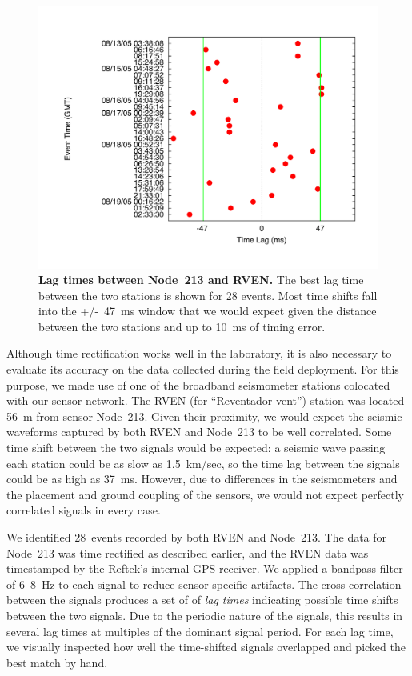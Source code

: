\begin{figure}[t]
\begin{center}
\includegraphics[width=\hsize]{./3-evaluation/figs/timingscatterplot.pdf}
\end{center}

\caption{\textbf{Lag times between Node~213 and RVEN.} The best lag time
between the two stations is shown for 28 events. Most time shifts fall into
the +/-~47~ms window that we would expect given the distance between the two
stations and up to 10~ms of timing error.}

\label{evaluation-fig-timingscatterplot}
\end{figure}


Although time rectification works well in the laboratory, it is also
necessary to evaluate its accuracy on the data collected during the field
deployment. For this purpose, we made use of one of the broadband seismometer
stations colocated with our sensor network. The RVEN (for ``Reventador
vent'') station was located 56~m from sensor Node~213. Given their proximity,
we would expect the seismic waveforms captured by both RVEN and Node~213 to
be well correlated. Some time shift between the two signals would be
expected: a seismic wave passing each station could be as slow as 1.5~km/sec,
so the time lag between the signals could be as high as 37~ms. However, due
to differences in the seismometers and the placement and ground coupling of
the sensors, we would not expect perfectly correlated signals in every case.

We identified 28~events recorded by both RVEN and Node~213. The data for
Node~213 was time rectified as described earlier, and the RVEN data was
timestamped by the Reftek's internal GPS receiver. We applied a bandpass
filter of 6--8~Hz to each signal to reduce sensor-specific artifacts. The
cross-correlation between the signals produces a set of of \textit{lag times}
indicating possible time shifts between the two signals. Due to the periodic
nature of the signals, this results in several lag times at multiples of the
dominant signal period. For each lag time, we visually inspected how well the
time-shifted signals overlapped and picked the best match by hand.

